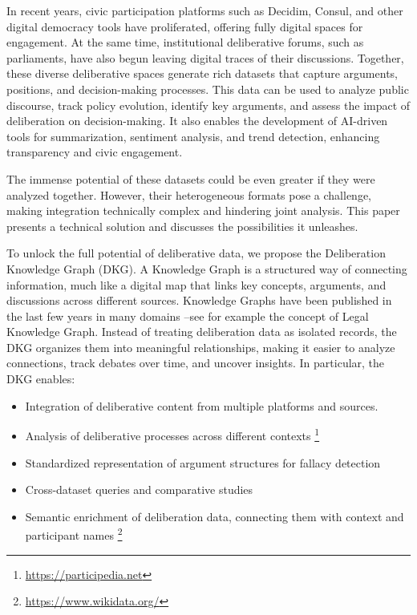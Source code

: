 \documentclass[runningheads]{llncs}  %
\begin{document}
In recent years, civic participation platforms such as Decidim, Consul, and other digital democracy tools have proliferated, offering fully digital spaces for engagement. At the same time, institutional deliberative forums, such as parliaments, have also begun leaving digital traces of their discussions. Together, these diverse deliberative spaces generate rich datasets that capture arguments, positions, and decision-making processes. This data can be used to analyze public discourse, track policy evolution, identify key arguments, and assess the impact of deliberation on decision-making. It also enables the development of AI-driven tools for summarization, sentiment analysis, and trend detection, enhancing transparency and civic engagement.

The immense potential of these datasets could be even greater if they were analyzed together. However, their heterogeneous formats pose a challenge, making integration technically complex and hindering joint analysis. This paper presents a technical solution and discusses the possibilities it unleashes. 

To unlock the full potential of deliberative data, we propose the Deliberation Knowledge Graph (DKG). A Knowledge Graph is a structured way of connecting information, much like a digital map that links key concepts, arguments, and discussions across different sources. Knowledge Graphs have been published in the last few years in many domains --see for example the concept of Legal Knowledge Graph\cite{lynx}. Instead of treating deliberation data as isolated records, the DKG organizes them into meaningful relationships, making it easier to analyze connections, track debates over time, and uncover insights. In particular, the DKG enables:

\begin{itemize}
    \item Integration of deliberative content from multiple platforms and sources. %
    \item Analysis of deliberative processes across different contexts
    \footnote{\url{https://participedia.net}}
    \item Standardized representation of argument structures for fallacy detection
    \item Cross-dataset queries and comparative studies
    \item Semantic enrichment of deliberation data, connecting them with context and participant names \footnote{\url{https://www.wikidata.org/}}
\end{itemize}
\end{document}
